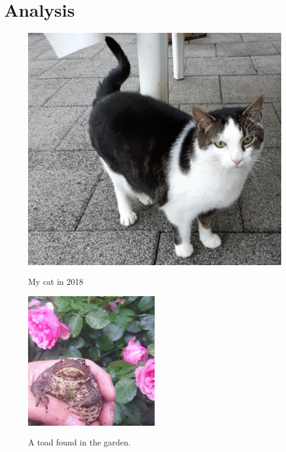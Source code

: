 \chapter{Analysis}\label{chapterAnalysis}


\begin{figure}
\centering
\includegraphics{img/Dala}
\label{img:cat}
\caption{My cat in 2018}
\end{figure}


\begin{figure}
\centering
\includegraphics[width=0.5\textwidth]{img/toad}
\label{img:toad}
\caption{A toad found in the garden.}
\end{figure}
